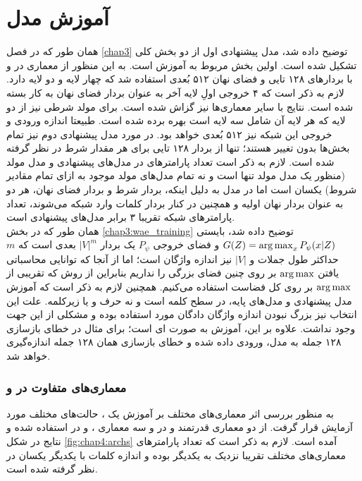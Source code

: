 \section{آموزش مدل}
همان طور که در فصل \ref{chap3} توضیح داده شد، مدل پیشنهادی اول از دو بخش کلی تشکیل شده است. اولین بخش مربوط به آموزش \wae{} است. به این منظور از معماری \transformer{} در \encoder{} و \decoder{} با بردارهای  \embedding{}
۱۲۸ تایی و فضای نهان ۵۱۲ بُعدی استفاده شد که \encoder{} چهار لایه و \decoder{} دو لایه دارد. لازم به ذکر است که ۴ خروجی اولِ لایه آخر \encoder{} به عنوان بردار فضای نهان به کار بسته شده است. نتایج با سایر معماری‌ها نیز گزاش شده‌ است. برای مولد شرطی نیز از دو لایه  که هر لایه آن شامل سه لایه  است بهره برده شده است. طبیعتا اندازه ورودی و خروجی این شبکه نیز ۵۱۲ بُعدی خواهد بود. در مورد مدل پیشنهادی دوم نیز تمام بخش‌ها بدون تغییر هستند؛ تنها از بردار \embedding{}
۱۲۸ تایی برای هر مقدار شرط در نظر گرفته شده است. لازم به ذکر است تعداد پارامتر‌های \decoder{} در مدل‌های پیشنهادی و مدل مولد \sentigan{} (منظور یک مدل مولد تنها است و نه تمام مدل‌های مولد موجود به ازای تمام مقادیر شروط) یکسان است اما در مدل \towardctg{} به دلیل اینکه، بردار شرط و بردار فضای نهان، هر دو به عنوان بردار نهان اولیه  و همچنین در کنار بردار \embedding{} کلمات وارد شبکه می‌شوند، تعداد پارامتر‌های شبکه \towardctg{} تقریبا ۳ برابر مدل‌های پیشنهادی است.
\\
همان طور که در بخش \ref{chap3:wae_training} توضیح داده شد، \decoder{} بایستی
$G(Z) = \operatorname*{arg\,max}_{x} P_\psi(x|Z)$
و فضای خروجی $P_\psi$ یک بردار $|V|^{m}$ بعدی است که $m$ حداکثر طول جملات و $|V|$ نیز اندازه واژگان است؛ اما از آنجا که توانایی محاسباتی یافتن $\operatorname*{arg\,max}$ بر روی چنین فضای بزرگی را نداریم بنابراین از روش
که تقریبی از $\operatorname*{arg\,max}$ بر روی کل فضاست استفاده می‌کنیم. همچنین لازم به ذکر است که آموزش مدل پیشنهادی و مدل‌های پایه، در سطح کلمه است و نه حرف و یا زیرکلمه. علت این انتخاب نیز بزرگ نبودن اندازه واژگان دادگان مورد استفاده بوده و مشکلی از این جهت وجود نداشت. علاوه بر این، آموزش به صورت 
ای
است؛ برای مثال در خطای بازسازی ۱۲۸ جمله به مدل، ورودی داده شده و خطای بازسازی همان ۱۲۸ جمله اندازه‌گیری خواهد شد.

\subsubsection{معماری‌های متفاوت در \encoder{} و \decoder{}}
به منظور بررسی اثر معماری‌های مختلف بر آموزش یک \wae{}، حالت‌های مختلف مورد آزمایش قرار گرفت. از دو معماری قدرتمند \lstm{} و \transformer{} در \decoder{} و سه معماری \lstm{}، \cnn{}  و \transformer{} در \encoder{} استفاده شده و نتایج در شکل \ref{fig:chap4:archs} آمده است. لازم به ذکر است که تعداد پارامتر‌های معماری‌های مختلف تقریبا نزدیک به یکدیگر بوده و اندازه \embedding{} کلمات با یکدیگر یکسان در نظر گرفته شده است.

